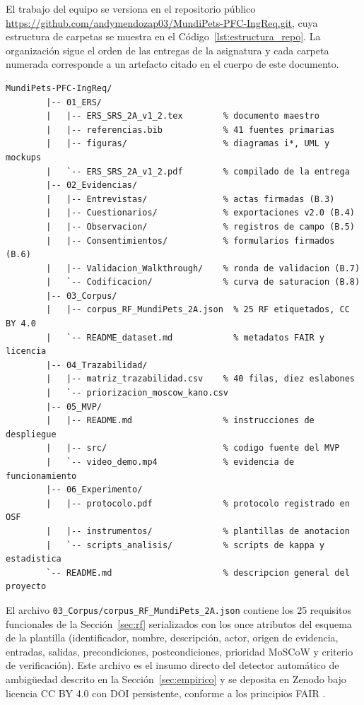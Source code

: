 \documentclass[journal,onecolumn]{IEEEtran}
\begin{document}
	El trabajo del equipo se versiona en el repositorio público
	\url{https://github.com/andymendozap03/MundiPets-PFC-IngReq.git}, cuya
	estructura de carpetas se muestra en el Código~\ref{lst:estructura_repo}. La
	organización sigue el orden de las entregas de la asignatura y cada carpeta
	numerada corresponde a un artefacto citado en el cuerpo de este documento.
	
	\begin{lstlisting}[style=csharp,caption={Estructura de carpetas del repositorio MundiPets-PFC-IngReq.},label={lst:estructura_repo}]
		MundiPets-PFC-IngReq/
		|-- 01_ERS/
		|   |-- ERS_SRS_2A_v1_2.tex        % documento maestro
		|   |-- referencias.bib            % 41 fuentes primarias
		|   |-- figuras/                   % diagramas i*, UML y mockups
		|   `-- ERS_SRS_2A_v1_2.pdf        % compilado de la entrega
		|-- 02_Evidencias/
		|   |-- Entrevistas/               % actas firmadas (B.3)
		|   |-- Cuestionarios/             % exportaciones v2.0 (B.4)
		|   |-- Observacion/               % registros de campo (B.5)
		|   |-- Consentimientos/           % formularios firmados (B.6)
		|   |-- Validacion_Walkthrough/    % ronda de validacion (B.7)
		|   `-- Codificacion/              % curva de saturacion (B.8)
		|-- 03_Corpus/
		|   |-- corpus_RF_MundiPets_2A.json  % 25 RF etiquetados, CC BY 4.0
		|   `-- README_dataset.md            % metadatos FAIR y licencia
		|-- 04_Trazabilidad/
		|   |-- matriz_trazabilidad.csv    % 40 filas, diez eslabones
		|   `-- priorizacion_moscow_kano.csv
		|-- 05_MVP/
		|   |-- README.md                  % instrucciones de despliegue
		|   |-- src/                       % codigo fuente del MVP
		|   `-- video_demo.mp4             % evidencia de funcionamiento
		|-- 06_Experimento/
		|   |-- protocolo.pdf              % protocolo registrado en OSF
		|   |-- instrumentos/              % plantillas de anotacion
		|   `-- scripts_analisis/          % scripts de kappa y estadistica
		`-- README.md                      % descripcion general del proyecto
	\end{lstlisting}
	
	El archivo \texttt{03\_Corpus/corpus\_RF\_MundiPets\_2A.json} contiene los 25
	requisitos funcionales de la Sección~\ref{sec:rf} serializados con los once
	atributos del esquema de la plantilla (identificador, nombre, descripción,
	actor, origen de evidencia, entradas, salidas, precondiciones,
	postcondiciones, prioridad MoSCoW y criterio de verificación). Este archivo
	es el insumo directo del detector automático de ambigüedad descrito en la
	Sección~\ref{sec:empirico} y se deposita en Zenodo bajo licencia CC BY 4.0
	con DOI persistente, conforme a los principios FAIR \cite{wilkinson2016}.
	
\end{document}
